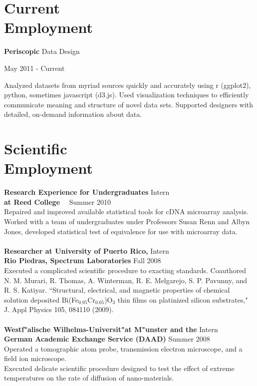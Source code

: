 \documentclass[margin,line]{resume}
\begin{document}
\begin{resume}
    \section{\mysidestyle Current\\Employment}
    \textbf{Periscopic} \hfill Data Design \vspace{-7.3mm}
\begin{flushright} May 2011 - Current \end{flushright} \vspace{-7.3mm}
Analyzed datasets from myriad sources quickly and accurately using r (ggplot2),
python, sometimes javascript (d3.js). Used visualization techniques to
efficiently communicate meaning and structure of novel data sets. Supported
designers with detailed, on-demand information about data.
    \section{\mysidestyle Scientific\\Employment} 
\textbf{Research Experience for Undergraduates} \hfill  Intern \\ 
\textbf{at Reed College} \ \  \hfill Summer 2010 \\
Repaired and improved available statistical tools for cDNA microarray analysis. Worked with a team of undergraduates under Professors Susan Renn and Albyn Jones, developed statistical test of equivalence for use with microarray data. \\
\vspace{-2mm} \\
\textbf{Researcher at University of Puerto Rico,} \hfill  Intern\\
\textbf{Rio Piedras, Spectrum Laboratories} \hfill Fall 2008	\\
Executed a complicated scientific procedure to exacting standards. Coauthored N. M. Murari, R. Thomas, A. Winterman, R. E. Melgarejo, S. P. Pavunny, and R. S. Katiyar. ``Structural, electrical, and magnetic properties of chemical solution deposited Bi(Fe$_{0.95}$Cr$_{0.05}$)O$_3$ thin films on platinized silicon substrates," J. Appl Physics 105, 084110 (2009). 
\\\vspace{-2mm}\\
\textbf{Westf"alische Wilhelms-Universit"at M"unster and the} \hfill  Intern \\
\textbf{German Academic Exchange Service (DAAD)} \hfill Summer 2008	\\
Operated a tomographic atom probe, transmission electron microscope, and a field ion microscope. \\ Executed delicate scientific procedure designed to test the effect of extreme temperatures on the rate of diffusion of nano-materials.


\end{resume}
\end{document}
